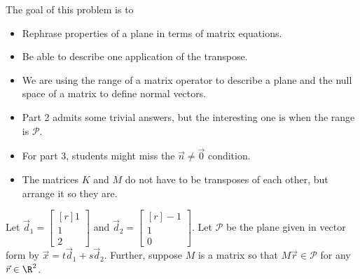 \documentclass{problemset}
\newcommand{\mat}[1]{\begin{bmatrix*}[r]#1\end{bmatrix*}}
\begin{document}
	\question
	\begin{annotation}
		\begin{goals}

			The goal of this problem is to
			\begin{itemize}
				\item Rephrase properties of a plane in terms of matrix equations.
				\item Be able to describe one application of the transpose.
			\end{itemize}
		\end{goals}

		\begin{notes}
			\begin{itemize}
				\item We are using the range of a matrix operator to describe a plane and the
					null space of a matrix to define normal vectors.
				\item Part 2 admits some trivial answers, but the interesting one is when 
					the range is $\mathcal P$.
				\item For part 3, students might miss the $\vec n\neq \vec 0$ condition.
				\item The matrices $K$ and $M$ do not have to be transposes of each other,
					but arrange it so they are.
			\end{itemize}
		\end{notes}
	\end{annotation}
	Let $\vec d_1=\mat{1\\1\\2}$ and $\vec d_2=\mat{-1\\1\\0}$.
	Let $\mathcal P$ be the plane given in vector form by $\vec x=t\vec d_1+s\vec d_2$.
	Further, suppose $M$ is a matrix so that $M\vec r\in\mathcal P$ for any $\vec r\in\R^2$.
\end{document}
